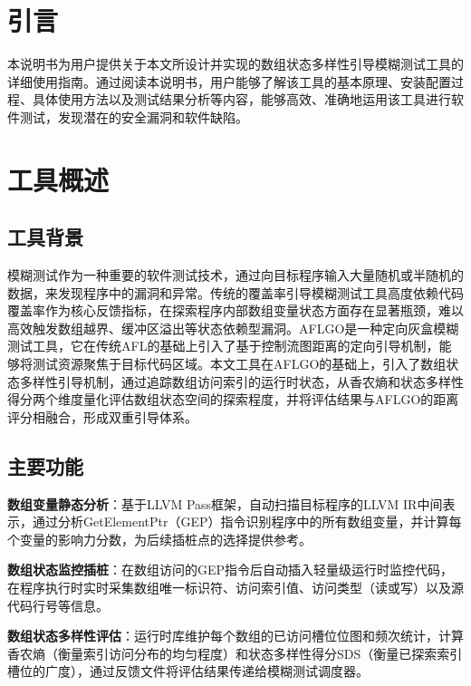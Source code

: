 \documentclass[bachelor]{njupthesis}
\begin{document}
\thesisappendix

\section{引言}

本说明书为用户提供关于本文所设计并实现的数组状态多样性引导模糊测试工具的详细使用指南。通过阅读本说明书，用户能够了解该工具的基本原理、安装配置过程、具体使用方法以及测试结果分析等内容，能够高效、准确地运用该工具进行软件测试，发现潜在的安全漏洞和软件缺陷。

\section{工具概述}

\subsection{工具背景}

模糊测试作为一种重要的软件测试技术，通过向目标程序输入大量随机或半随机的数据，来发现程序中的漏洞和异常。传统的覆盖率引导模糊测试工具高度依赖代码覆盖率作为核心反馈指标，在探索程序内部数组变量状态方面存在显著瓶颈，难以高效触发数组越界、缓冲区溢出等状态依赖型漏洞。AFLGO是一种定向灰盒模糊测试工具，它在传统AFL的基础上引入了基于控制流图距离的定向引导机制，能够将测试资源聚焦于目标代码区域。本文工具在AFLGO的基础上，引入了数组状态多样性引导机制，通过追踪数组访问索引的运行时状态，从香农熵和状态多样性得分两个维度量化评估数组状态空间的探索程度，并将评估结果与AFLGO的距离评分相融合，形成双重引导体系。

\subsection{主要功能}

\textbf{数组变量静态分析}：基于LLVM Pass框架，自动扫描目标程序的LLVM IR中间表示，通过分析GetElementPtr（GEP）指令识别程序中的所有数组变量，并计算每个变量的影响力分数，为后续插桩点的选择提供参考。

\textbf{数组状态监控插桩}：在数组访问的GEP指令后自动插入轻量级运行时监控代码，在程序执行时实时采集数组唯一标识符、访问索引值、访问类型（读或写）以及源代码行号等信息。

\textbf{数组状态多样性评估}：运行时库维护每个数组的已访问槽位位图和频次统计，计算香农熵（衡量索引访问分布的均匀程度）和状态多样性得分SDS（衡量已探索索引槽位的广度），通过反馈文件将评估结果传递给模糊测试调度器。
\end{document}
